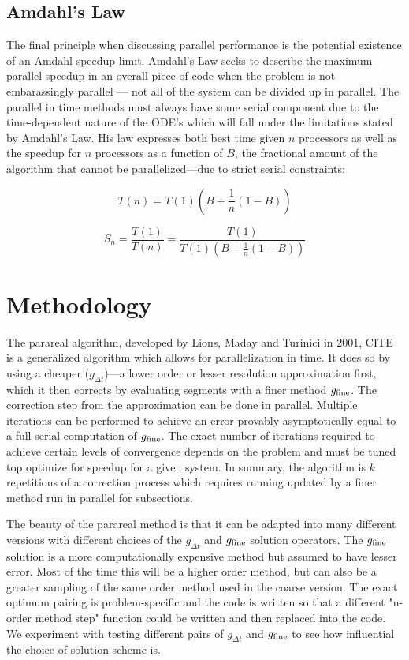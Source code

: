 \documentclass[letterpaper,12pt]{article}
\begin{document}
\subsection{Amdahl's Law}

The final principle when discussing parallel performance is the potential existence of an Amdahl speedup limit. Amdahl's Law seeks to describe the maximum parallel speedup in an overall piece of code when the problem is not embarassingly parallel --- not all of the system can be divided up in parallel. The parallel in time methods must always have some serial component due to the time-dependent nature of the ODE's which will fall under the limitations stated by Amdahl's Law.  His law expresses both best time given $n$ processors as well as the speedup for $n$ processors as a function of $B$, the fractional amount of the algorithm that cannot be parallelized---due to strict serial constraints:

\begin{equation}
T(n) = T(1) \left( B + \frac{1}{n} (1-B) \right)
\end{equation}

\begin{equation}
S_{n} = \frac{T(1)}{T(n)} = \frac{T(1)}{ T(1) \left( B + \frac{1}{n} (1-B) \right)}
\end{equation}

\section{Methodology}

The parareal algorithm, developed by Lions, Maday and Turinici in 2001, CITE is
a generalized algorithm which allows for parallelization in time. It does so
by using a cheaper ($g_{\Delta t}$)---a lower order or lesser resolution
approximation first, which it then corrects by evaluating segments with a finer
method $g_{\textnormal{fine}}$. The correction step from the approximation can
be done in parallel. Multiple iterations can be performed to achieve an error
provably asymptotically equal to a full serial computation of
$g_{\textnormal{fine}}$. The exact number of iterations required to achieve
certain levels of convergence depends on the problem and must be tuned top
optimize for speedup for a given system. In summary, the algorithm is $k$
repetitions of a correction process which requires running updated by a finer
method run in parallel for subsections.

The beauty of the parareal method is that it can be adapted into many different versions with different choices of the $g_{\Delta t}$ and $g_{\textnormal{fine}}$ solution operators. The $g_{\textnormal{fine}}$ solution is a more computationally expensive method but assumed to have lesser error.  Most of the time this will be a higher order method, but can also be a greater sampling of the same order method used in the coarse version.  The exact optimum pairing is problem-specific and the code is written so that a different "n-order method step" function could be written and then replaced into the code. We experiment with testing different pairs of $g_{\Delta t}$ and $g_{\textnormal{fine}}$ to see how influential the choice of solution scheme is.
\end{document}
